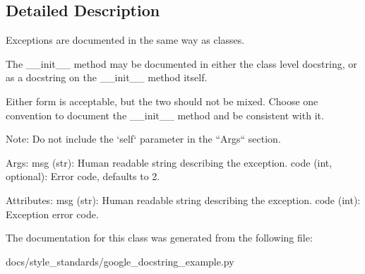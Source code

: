 \subsection{Detailed Description}
\begin{DoxyVerb}Exceptions are documented in the same way as classes.

The __init__ method may be documented in either the class level
docstring, or as a docstring on the __init__ method itself.

Either form is acceptable, but the two should not be mixed. Choose one
convention to document the __init__ method and be consistent with it.

Note:
  Do not include the `self` parameter in the ``Args`` section.

Args:
  msg (str): Human readable string describing the exception.
  code (int, optional): Error code, defaults to 2.

Attributes:
  msg (str): Human readable string describing the exception.
  code (int): Exception error code.\end{DoxyVerb}
 

The documentation for this class was generated from the following file\+:\begin{DoxyCompactItemize}
\item 
docs/style\+\_\+standards/google\+\_\+docstring\+\_\+example.\+py\end{DoxyCompactItemize}
